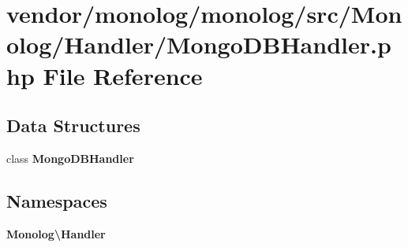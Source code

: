 \section{vendor/monolog/monolog/src/\+Monolog/\+Handler/\+Mongo\+D\+B\+Handler.php File Reference}
\label{_mongo_d_b_handler_8php}
\subsection*{Data Structures}
\begin{DoxyCompactItemize}
\item 
class {\bf Mongo\+D\+B\+Handler}
\end{DoxyCompactItemize}
\subsection*{Namespaces}
\begin{DoxyCompactItemize}
\item 
 {\bf Monolog\textbackslash{}\+Handler}
\end{DoxyCompactItemize}
